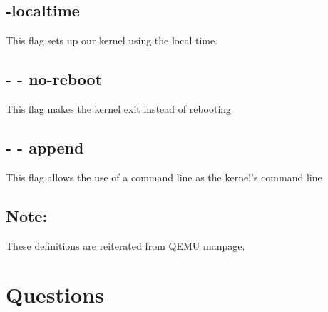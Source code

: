 \documentclass[draftclsnofoot, onecolumn, compsoc, 10pt]{IEEEtran}
\begin{document}
	\subsection{-localtime}


    	This flag sets up our kernel using the local time.
	\subsection{- - no-reboot}
    	This flag makes the kernel exit instead of rebooting
	\subsection{- - append}
    	This flag allows the use of a command line as the kernel's command line

	\subsection{Note:}
		These definitions are reiterated from QEMU manpage\cite{qemu}.

\section{Questions}
\end{document}
